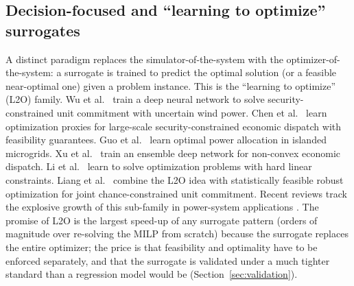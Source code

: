 
\subsection{Decision-focused and ``learning to optimize'' surrogates}
\label{sec:tax:l2o}

A distinct paradigm replaces the simulator-of-the-system with the
optimizer-of-the-system: a surrogate is trained to predict the
optimal solution (or a feasible near-optimal one) given a problem
instance. This is the ``learning to optimize'' (L2O) family.
Wu et al.~\cite{Wu2022231} train a deep neural network to solve
security-constrained unit commitment with uncertain wind power.
Chen et al.~\cite{Chen2022,Chen20244723} learn optimization proxies
for large-scale security-constrained economic dispatch with feasibility
guarantees. Guo et al.~\cite{Guo20222057} learn optimal power
allocation in islanded microgrids. Xu et al.~\cite{Xu20223066}
train an ensemble deep network for non-convex economic dispatch.
Li et al.~\cite{Li202359995} learn to solve optimization problems
with hard linear constraints. Liang et al.~\cite{Liang20246508}
combine the L2O idea with statistically feasible robust optimization
for joint chance-constrained unit commitment. Recent reviews track
the explosive growth of this sub-family in power-system
applications \cite{Khaloie2025,Lim2025,Ruan2021221}.
The promise of L2O is the largest speed-up of any surrogate
pattern (orders of magnitude over re-solving the MILP from scratch)
because the surrogate replaces the entire optimizer; the price is
that feasibility and optimality have to be enforced separately,
and that the surrogate is validated under a much tighter standard
than a regression model would be
(Section~\ref{sec:validation}).
